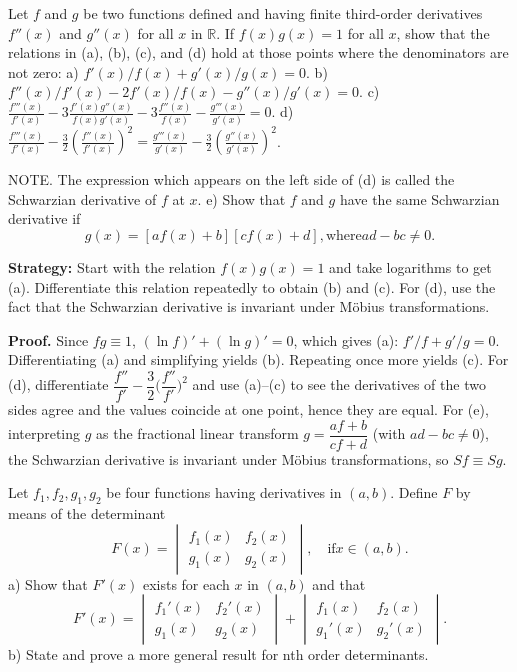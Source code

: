 \begin{problembox}
Let \( f \) and \( g \) be two functions defined and having finite third-order derivatives \( f''(x) \) and \( g''(x) \) for all \( x \) in \( \mathbb{R} \). If \( f(x)g(x) = 1 \) for all \( x \), show that the relations in (a), (b), (c), and (d) hold at those points where the denominators are not zero:
a) \( f'(x)/f(x) + g'(x)/g(x) = 0 \).
b) \( f''(x)/f'(x) - 2f'(x)/f(x) - g''(x)/g'(x) = 0 \).
c) \( \frac{f'''(x)}{f'(x)} - 3\frac{f'(x)g''(x)}{f(x)g'(x)} - 3\frac{f''(x)}{f(x)} - \frac{g'''(x)}{g'(x)} = 0 \).
d) \( \frac{f'''(x)}{f'(x)} - \frac{3}{2}\left(\frac{f''(x)}{f'(x)}\right)^2 = \frac{g'''(x)}{g'(x)} - \frac{3}{2}\left(\frac{g''(x)}{g'(x)}\right)^2 \).

NOTE. The expression which appears on the left side of (d) is called the Schwarzian derivative of \( f \) at \( x \).
e) Show that \( f \) and \( g \) have the same Schwarzian derivative if
\[ g(x) = [af(x) + b][cf(x) + d], \text{where} ad - bc \neq 0. \]
\end{problembox}

\noindent\textbf{Strategy:} Start with the relation \( f(x)g(x) = 1 \) and take logarithms to get (a). Differentiate this relation repeatedly to obtain (b) and (c). For (d), use the fact that the Schwarzian derivative is invariant under Möbius transformations.

\noindent\textbf{Proof.}
Since $fg\equiv 1$, $(\ln f)'+(\ln g)'=0$, which gives (a): $f'/f+g'/g=0$. Differentiating (a) and simplifying yields (b). Repeating once more yields (c). For (d), differentiate $\dfrac{f''}{f'}-\dfrac{3}{2}\Big(\dfrac{f''}{f'}\Big)^{\!2}$ and use (a)–(c) to see the derivatives of the two sides agree and the values coincide at one point, hence they are equal. For (e), interpreting $g$ as the fractional linear transform $g=\dfrac{af+b}{cf+d}$ (with $ad-bc\ne 0$), the Schwarzian derivative is invariant under Möbius transformations, so $Sf\equiv Sg$.



\begin{problembox}
Let \( f_1, f_2, g_1, g_2 \) be four functions having derivatives in \( (a, b) \). Define \( F \) by means of the determinant
\[ F(x) = \begin{vmatrix}
f_1(x) & f_2(x) \\
g_1(x) & g_2(x)
\end{vmatrix}, \quad \text{if} x \in (a, b). \]
a) Show that \( F'(x) \) exists for each \( x \) in \( (a, b) \) and that
\[ F'(x) = \begin{vmatrix}
f_1'(x) & f_2'(x) \\
g_1(x) & g_2(x)
\end{vmatrix} + \begin{vmatrix}
f_1(x) & f_2(x) \\
g_1'(x) & g_2'(x)
\end{vmatrix}. \]
b) State and prove a more general result for nth order determinants.
\end{problembox}

